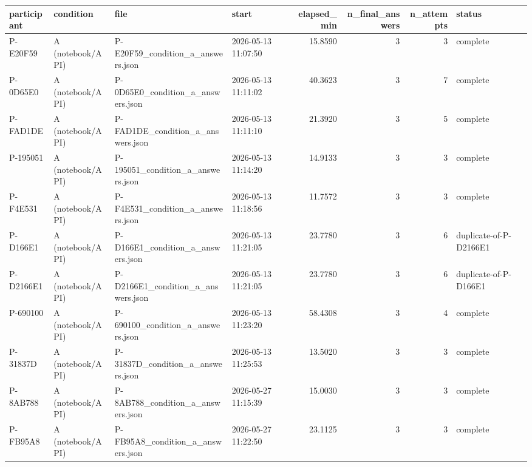 \begin{tabular}{llllrrrl}
\toprule
participant &          condition &                                            file &               start &  elapsed\_min &  n\_final\_answers &  n\_attempts &                   status \\
\midrule
   P-E20F59 &   A (notebook/API) &               P-E20F59\_condition\_a\_answers.json & 2026-05-13 11:07:50 &      15.8590 &                3 &           3 &                 complete \\
   P-0D65E0 &   A (notebook/API) &               P-0D65E0\_condition\_a\_answers.json & 2026-05-13 11:11:02 &      40.3623 &                3 &           7 &                 complete \\
   P-FAD1DE &   A (notebook/API) &               P-FAD1DE\_condition\_a\_answers.json & 2026-05-13 11:11:10 &      21.3920 &                3 &           5 &                 complete \\
   P-195051 &   A (notebook/API) &               P-195051\_condition\_a\_answers.json & 2026-05-13 11:14:20 &      14.9133 &                3 &           3 &                 complete \\
   P-F4E531 &   A (notebook/API) &               P-F4E531\_condition\_a\_answers.json & 2026-05-13 11:18:56 &      11.7572 &                3 &           3 &                 complete \\
   P-D166E1 &   A (notebook/API) &               P-D166E1\_condition\_a\_answers.json & 2026-05-13 11:21:05 &      23.7780 &                3 &           6 &   duplicate-of-P-D2166E1 \\
  P-D2166E1 &   A (notebook/API) &              P-D2166E1\_condition\_a\_answers.json & 2026-05-13 11:21:05 &      23.7780 &                3 &           6 &    duplicate-of-P-D166E1 \\
   P-690100 &   A (notebook/API) &               P-690100\_condition\_a\_answers.json & 2026-05-13 11:23:20 &      58.4308 &                3 &           4 &                 complete \\
   P-31837D &   A (notebook/API) &               P-31837D\_condition\_a\_answers.json & 2026-05-13 11:25:53 &      13.5020 &                3 &           3 &                 complete \\
   P-8AB788 &   A (notebook/API) &               P-8AB788\_condition\_a\_answers.json & 2026-05-27 11:15:39 &      15.0030 &                3 &           3 &                 complete \\
   P-FB95A8 &   A (notebook/API) &               P-FB95A8\_condition\_a\_answers.json & 2026-05-27 11:22:50 &      23.1125 &                3 &           3 &                 complete \\

\end{tabular}

